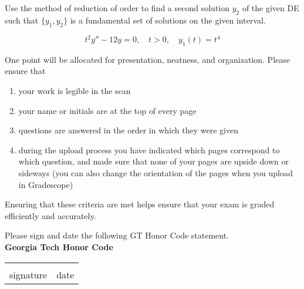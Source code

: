 \documentclass[12pt]{exam}
\begin{document}
\begin{questions}
    \newpage 
    \question[10] Use the method of reduction of order to find a second solution $y_2$ of the given DE such that $\{ y_1 , y_2 \}$ is a fundamental set of solutions on the given interval.
    
    $$t^2y'' - 12y = 0, \quad t > 0, \quad y_1(t) = t^4$$
    
    \newpage 
    \question[1] One point will be allocated for presentation, neatness, and organization. Please ensure that
    \begin{enumerate}
        \item your work is legible in the scan
        \item your name or initials are at the top of every page
        \item questions are answered in the order in which they were given
        \item during the upload process you have indicated which pages correspond to which question, and made sure that none of your pages are upside down or sideways (you can also change the orientation of the pages when you upload in Gradescope)
    \end{enumerate}
    Ensuring that these criteria are met helps ensure that your exam is graded efficiently and accurately. 
    


    
\end{questions}
    
    Please sign and date the following GT Honor Code statement. \\ 
    
    \vspace{6pt}
    \textbf{Georgia Tech Honor Code}\\
    \GTHonorCode
    
    \begin{center}
    \begin{center}
        \def\arraystretch{0.35}%
        \begin{tabular}{ b{8cm} b{8cm} }
        \vspace{.5cm} \underline{\hspace{7cm}} & \vspace{.5cm} \underline{\hspace{4.5cm}}  \tabularnewline
        \vspace{6pt} signature & \vspace{6pt} date    
        \end{tabular}
    \end{center}
    \end{center}    
\end{document}
